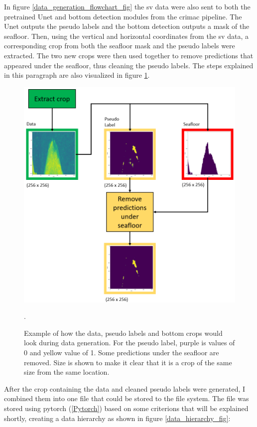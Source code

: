         In figure \ref{data_generation_flowchart_fig} the \gls{sv} data were also sent to both the pretrained Unet and bottom detection modules from the \gls{crimac} pipeline. The Unet outputs the pseudo labels and the bottom detection outputs a mask of the seafloor. Then, using the vertical and horizontal coordinates from the \gls{sv} data, a corresponding crop from both the seafloor mask and the pseudo labels were extracted. The two new crops were then used together to remove predictions that appeared under the seafloor, thus cleaning the pseudo labels. The steps explained in this paragraph are also visualized in figure \ref{crop_extract_fig}.
        \clearpage
        \begin{figure}[H]
            \centering
            \includegraphics[scale=0.5]{figures/crop_extract_illustration.png}
            \caption{Example of how the data, pseudo labels and bottom crops would look during data generation. For the pseudo label, purple is values of 0 and yellow value of 1. Some predictions under the seafloor are removed.  Size is shown to make it clear that it is a crop of the same size from the same location.}.
          	\medskip 
            \label{crop_extract_fig}
        \end{figure}
        
        After the crop containing the data and cleaned pseudo labels were generated, I combined them into one file that could be stored to the file system. The file was stored using pytorch (\ref{Pytorch}) based on some criterions that will be explained shortly, creating a data hierarchy as shown in figure \ref{data_hierarchy_fig}:
        
